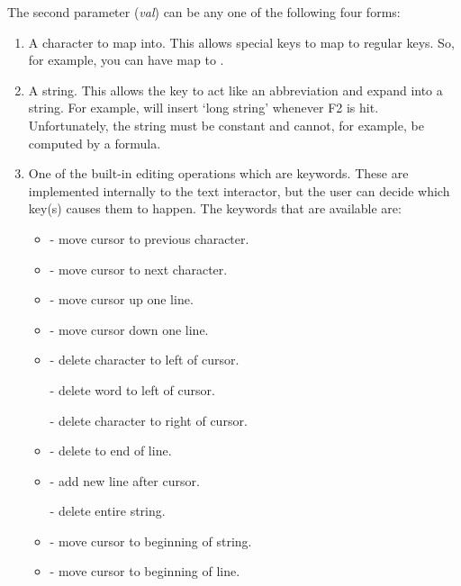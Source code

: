 The second parameter ({\it val}) can be any one of the following four
forms:
\begin{enumerate}
\item A character to map into.  This allows special keys to map to regular keys.
So, for example, you can have  map to .

\item A string.  This allows the key to act like an abbreviation and expand into a
string.  For example,  will
insert `long string' whenever F2 is hit.
Unfortunately, the string must be constant and cannot, for example, be
computed by a formula.

\item 
One of the built-in editing operations which are keywords.  These are
implemented internally to the text interactor, but the user can decide which
key(s) causes them to happen.  The keywords that are available are:
\begin{itemize}
\item {} - move cursor to previous character.

\item {} - move cursor to next character.

\item {} - move cursor up one line.

\item {} - move cursor down one line.

\item {} - delete character to left of cursor.
		
 - delete word to left of cursor.
		
 - delete character to right of cursor.

\item {} - delete to end of line.

\item {} - add new line after cursor.
		
 - delete entire string.

\item {} - move cursor to beginning of string.

\item {} - move cursor to beginning of line.
		

\end{itemize}
\end{enumerate}
